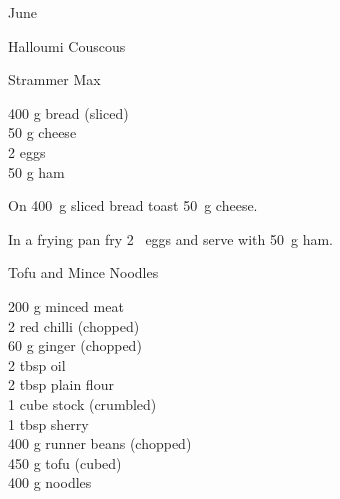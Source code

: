 \begin{menu}{June}
\begin{recipe}{2}{Halloumi Couscous}
\begin{instructions}
    \end{instructions}
    \end{recipe}%
  
    \begin{recipe}{1}{Strammer Max}%
		\begin{ingredients}
		400 g bread (sliced) \\
	50 g cheese  \\
	2  eggs  \\
	50 g ham  \\
	
		\end{ingredients}
	
	
    \begin{instructions}
    \item 
        On
        400~g sliced bread
        toast
        50~g  cheese.
      \item 
        In a frying pan fry
        2~  eggs
        and serve with
        50~g  ham.
      
    \end{instructions}
    \end{recipe}%
  
    \begin{recipe}{2}{Tofu and Mince Noodles}%
		\begin{ingredients}
		200 g minced meat  \\
	2  red chilli (chopped) \\
	60 g ginger (chopped) \\
	2 tbsp oil  \\
	2 tbsp plain flour  \\
	1 cube stock (crumbled) \\
	1 tbsp sherry  \\
	400 g runner beans (chopped) \\
	450 g tofu (cubed) \\
	400 g noodles  \\
	
		\end{ingredients}
	
	

\end{recipe}
\end{menu}
